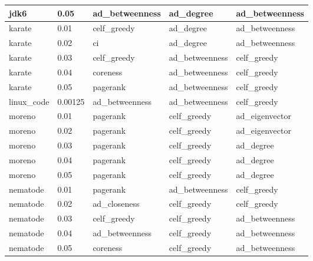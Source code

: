 \begin{longtable}[c]{|l|l|l|l|l|}
	jdk6             & 0.05            & ad\_betweenness        & ad\_degree             & ad\_betweenness     \\ \hline
	karate           & 0.01            & celf\_greedy           & ad\_degree             & ad\_betweenness     \\ \hline
	karate           & 0.02            & ci                     & ad\_degree             & ad\_betweenness     \\ \hline
	karate           & 0.03            & celf\_greedy           & ad\_betweenness        & celf\_greedy        \\ \hline
	karate           & 0.04            & coreness               & ad\_betweenness        & celf\_greedy        \\ \hline
	karate           & 0.05            & pagerank               & ad\_betweenness        & celf\_greedy        \\ \hline
	linux\_code      & 0.00125         & ad\_betweenness        & ad\_betweenness        & celf\_greedy        \\ \hline
	moreno           & 0.01            & pagerank               & celf\_greedy           & ad\_eigenvector     \\ \hline
	moreno           & 0.02            & pagerank               & celf\_greedy           & ad\_eigenvector     \\ \hline
	moreno           & 0.03            & pagerank               & celf\_greedy           & ad\_degree          \\ \hline
	moreno           & 0.04            & pagerank               & celf\_greedy           & ad\_degree          \\ \hline
	moreno           & 0.05            & pagerank               & celf\_greedy           & ad\_degree          \\ \hline
	nematode         & 0.01            & pagerank               & ad\_betweenness        & celf\_greedy        \\ \hline
	nematode         & 0.02            & ad\_closeness          & celf\_greedy           & celf\_greedy        \\ \hline
	nematode         & 0.03            & celf\_greedy           & celf\_greedy           & ad\_betweenness     \\ \hline
	nematode         & 0.04            & ad\_betweenness        & celf\_greedy           & ad\_betweenness     \\ \hline
	nematode         & 0.05            & coreness               & celf\_greedy           & ad\_betweenness     \\ \hline

\end{longtable}
